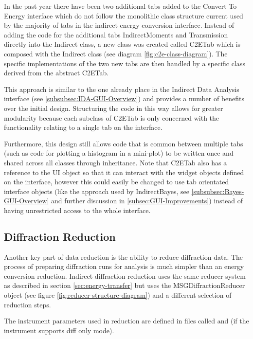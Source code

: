 \documentclass[paper=a4, fontsize=11pt]{scrartcl}	%
\numberwithin{equation}{section}															%
\numberwithin{figure}{section}																%
\numberwithin{table}{section}																%
\begin{document}
In the past year there have been two additional tabs added to the Convert To Energy interface which do not follow the monolithic class structure current used by the majority of tabs in the indirect energy conversion interface. Instead of adding the code for the additional tabs IndirectMoments and Transmission directly into the Indirect class, a new class was created called C2ETab which is composed with the Indirect class (see diagram \ref{fig:c2e-class-diagram}). The specific implementations of the two new tabs are then handled by a specific class derived from the abstract C2ETab.

This approach is similar to the one already place in the Indirect Data Analysis interface (see \ref{subsubsec:IDA-GUI-Overview}) and provides a number of benefits over the initial design. Structuring the code in this way allows for greater modularity because each subclass of C2ETab is only concerned with the functionality relating to a single tab on the interface.

Furthermore, this design still allows code that is common between multiple tabs (such as code for plotting a histogram in a mini-plot) to be written once and shared across all classes through inheritance. Note that C2ETab also has a reference to the UI object so that it can interact with the widget objects defined on the interface, however this could easily be changed to use tab orientated interface objects (like the approach used by IndirectBayes, see \ref{subsubsec:Bayes-GUI-Overview} and further discussion in \ref{subsec:GUI-Improvements}) instead of having unrestricted access to the whole interface.

\subsection{Diffraction Reduction}
\label{subsec:indirect-diffraction}
Another key part of data reduction is the ability to reduce diffraction data. The process of preparing diffraction runs for analysis is much simpler than an energy conversion reduction. Indirect diffraction reduction uses the same reducer system as described in section \ref{sec:energy-transfer} but uses the MSGDiffractionReducer object (see figure \ref{fig:reducer-structure-diagram}) and a different selection of reduction steps. 

The instrument parameters used in reduction are defined in files called  and  (if the instrument supports diff only mode).
\end{document}
